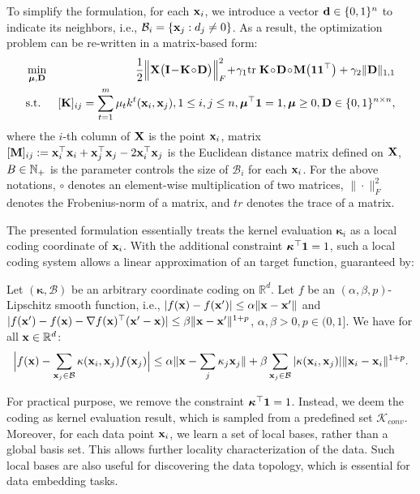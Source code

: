 To simplify the formulation, for each $\mathbf{x}_i$, we introduce a vector ${\bf d} \in\{0,1\}^n$ to indicate its neighbors, i.e., $\mathcal B_i =\{\mathbf{x}_j: d_j\neq0\}$. As a result, the optimization problem can be re-written in a matrix-based form:
\begin{eqnarray}
\hspace{0cm}&\min_{\bm\mu,\D}& \!\!\!\!\frac{1}{2} \Big\| \X \big(\I \!-\! \K\!\circ\!\D\big) \Big\|^2_F \!+\! \gamma_1\tr\K\!\circ\!\D\!\circ\!\M\big(\1\1^\top\big) + \gamma_2 \| \D \|_{1,1} \label{eqn:obj}\\
\hspace{0cm}&\st& [\K]_{ij}=\sum_{t=1}^m\mu_tk^t(\x_i, \x_j), 1\leq i, j \leq n, \bm\mu^\top\1 = 1, \bm\mu\geq 0, \D\in\{0,1\}^{n\times n} \nonumber,
\end{eqnarray}
where the $i$-th column of ${\mathbf X}$ is the point $\mathbf{x}_i$, matrix $[{\bf M}]_{ij} := \mathbf{x}_i^\top\mathbf{x}_i+\mathbf{x}_j^\top\mathbf{x}_j - 2\mathbf{x}_i^\top\mathbf{x}_j$ is the Euclidean distance matrix defined on ${\mathbf X}$, $B\in{\mathbb N}_+$ is the parameter controls the size of $\mathcal B_i$ for each $\mathbf{x}_i$. For the above notations, $\circ$ denotes an element-wise multiplication of two matrices, $\|\cdot\|^2_F$ denotes the Frobenius-norm of a matrix, and $tr$ denotes the trace of a matrix.

The presented formulation essentially treats the kernel evaluation $\bm\kappa_i$ as a local coding coordinate of $\mathbf{x}_i$. With the additional constraint $\boldsymbol{\kappa}^\top\mathbf{1} = 1$, such a local coding system allows a linear approximation of an target function, guaranteed by\cite{nips/YuZG09}:
\begin{theorem}
Let $(\bm\kappa, \mathcal B)$ be an arbitrary coordinate coding on $\mathbb R^d$. Let $f$ be an $(\alpha, \beta, p)$-Lipschitz smooth function, i.e., $| f(\mathbf{x}) - f(\mathbf{x}')| \leq \alpha \| \mathbf{x} - \mathbf{x}'\|$ and $|f(\mathbf{x}') - f(\mathbf{x}) - \nabla f(\mathbf{x})^\top(\mathbf{x}' - \mathbf{x})| \leq \beta\|\mathbf{x} - \mathbf{x}'\|^{1+p}$, $\alpha, \beta>0, p\in(0, 1]$. We have for all $\mathbf{x}\in\mathbb R^d$:
\[
\Big| f(\mathbf{x}) - \sum_{\mathbf{x}_j\in\mathcal B}\kappa(\mathbf{x}_i, \mathbf{x}_j)f(\mathbf{x}_j) \Big| \leq \alpha\| \mathbf{x} - \sum_j\kappa_j\mathbf{x}_j \| + \beta \sum_{\mathbf{x}_j\in\mathcal B}| \kappa(\mathbf{x}_i, \mathbf{x}_j) | \| \mathbf{x}_i - \mathbf{x}_i \|^{1+p}.
\]
\end{theorem}
For practical purpose, we remove the constraint $\boldsymbol{\kappa}^\top\mathbf{1}=1$. Instead, we deem the coding as kernel evaluation result, which is sampled from a predefined set $\mathcal K_{conv}$. Moreover, for each data point $\mathbf{x}_i$, we learn a set of local bases, rather than a global basis set. This allows further locality characterization of the data. Such local bases are also useful for discovering the data topology, which is essential for data embedding tasks.

